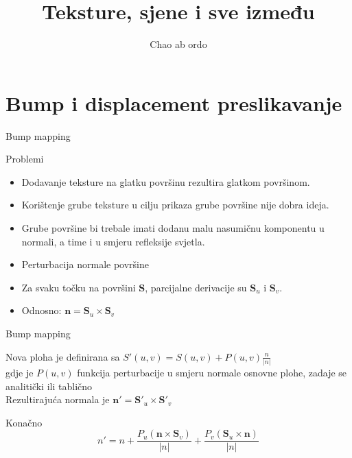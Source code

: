 \documentclass[9pt]{beamer}
\title{Teksture, sjene i sve između}
\subtitle {Chao ab ordo}
\institute{Računalna grafika}
\begin{document}
\begin{frame}
 \titlepage
\end{frame}

\section{Bump i displacement preslikavanje}
\begin{frame}{Bump mapping}
	\begin{block}{Problemi}
		\begin{itemize}
			\item Dodavanje teksture na glatku površinu rezultira glatkom površinom.
			\item Korištenje grube teksture u cilju prikaza grube površine nije dobra ideja.
			\item Grube površine bi trebale imati dodanu malu nasumičnu komponentu u normali, a time i u smjeru refleksije svjetla.
		\end{itemize}
	\end{block}
	\begin{itemize}
		\item Perturbacija normale površine
		\item Za svaku točku na površini $\mathbf{S}$, parcijalne derivacije su $\mathbf{S}_u$ i $\mathbf{S}_v$. 
		\item Odnosno: $\mathbf{n} = \mathbf{S}_u \times\mathbf{S}_v$
	\end{itemize}
\end{frame}	
%
\begin{frame}{Bump mapping}
	\begin{block}{}
		Nova ploha je definirana sa $S'(u,v) = S(u,v) + P(u,v)\frac{n}{|n|}$ \\
		gdje je $P(u,v)$ funkcija perturbacije u smjeru normale osnovne plohe, zadaje se analitički ili tablično\\
		Rezultirajuća normala je $\mathbf{n'} = \mathbf{S'}_{u} \times \mathbf{S'}_{v}$ 
	\end{block}
	
	\begin{block}{Konačno}
		$$n' = n + \frac{P_{u}(\mathbf{n} \times \mathbf{S}_{v})}{|n|} + \frac{P_{v}(\mathbf{S}_{u} \times \mathbf{n})}{|n|}$$
	\end{block}
\end{frame}
%
\end{document}
